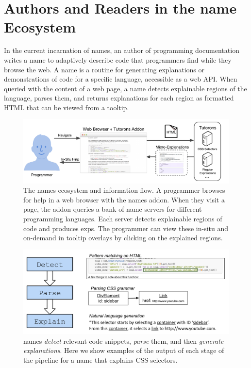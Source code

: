 \section{Authors and Readers in the \Gls{name} Ecosystem}

In the current incarnation of \Glspl{name}, an author of programming documentation writes a \Gls{name} to adaptively describe code that programmers find while they browse the web.
A \Gls{name} is a routine for generating explanations or demonstrations of code for a specific language, accessible as a web API\@.
When queried with the content of a web page, a \Gls{name} detects explainable regions of the language, parses them, and returns explanations for each region as formatted HTML that can be viewed from a tooltip.

\begin{figure}
    \includegraphics[width=\columnwidth]{figures/tutoron_ecosystem}
    \caption{%
    The \Glspl{name} ecosystem and information flow.
    A programmer browses for help in a web browser with the \Glspl{name} addon.
    When they visit a page, the addon queries a bank of \Gls{name} servers for different programming languages.
    Each server detects explainable regions of code and produces \glspl{exp}.
    The programmer can view these in-situ and on-demand in tooltip overlays by clicking on the explained regions.
    }\label{fig:tutoron_ecosystem}
\end{figure}

\begin{figure}
\centering
    \includegraphics[width=\columnwidth]{figures/explanation_pipeline}
    \caption{\Glspl{name} \emph{detect} relevant code snippets, \emph{parse} them, and then \emph{generate explanations}.  Here we show examples of the output of each stage of the pipeline for a \Gls{name} that explains CSS selectors.}\label{fig:explanation_pipeline}
\end{figure}
\fi

